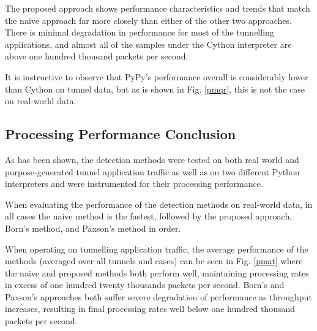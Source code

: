 \documentclass{llncs}
\begin{document}



The proposed approach shows performance characteristics and trends that match
the naive approach far more closely than either of the other two approaches.
There is minimal degradation in performance for most of the tunnelling
applications, and almost all of the samples under the Cython interpreter are
above one hundred thousand packets per second.

It is instructive to observe that PyPy's performance overall is considerably
lower than Cython on tunnel data, but as is shown in Fig. \ref{pmqr}, this is
not the case on real-world data.

\subsection{Processing Performance Conclusion}
As has been shown, the detection methods were tested on both real world and
purpose-generated tunnel application traffic as well as on two different Python
interpreters and were instrumented for their processing performance.

When evaluating the performance of the detection methods on real-world data, in all
cases the naive method is the fastest, followed by the proposed approach, Born's
method, and Paxson's method in order.

When operating on tunnelling application traffic, the average performance of the
methods (averaged over all tunnels and cases) can be seen in Fig. \ref{pmat}
where the naive and proposed methods both perform well, maintaining processing
rates in excess of one hundred twenty thousands packets per second. Born's and
Paxson's approaches both suffer severe degradation of performance as throughput
increases, resulting in final processing rates well below one hundred thousand
packets per second.
\end{document}
